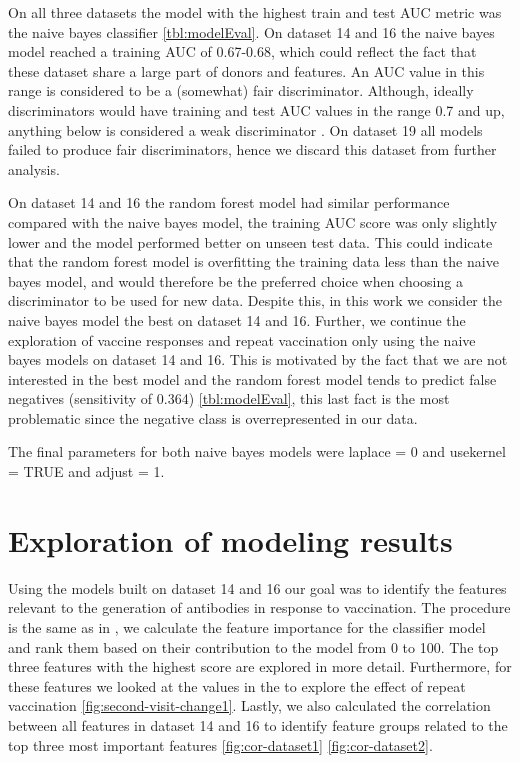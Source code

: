 On all three datasets the model with the highest train and test AUC metric was the naive bayes classifier \autoref{tbl:modelEval}.
On dataset 14 and 16 the naive bayes model reached a training AUC of 0.67-0.68, which could reflect the fact that these dataset share a large part of donors and features.
An AUC value in this range is considered to be a (somewhat) fair discriminator.
Although, ideally discriminators would have training and test AUC values in the range 0.7 and up, anything below is considered a weak discriminator \citep{L_demann_2006}.
On dataset 19 all models failed to produce fair discriminators, hence we discard this dataset from further analysis.

On dataset 14 and 16 the random forest model had similar performance compared with the naive bayes model, the training AUC score was only slightly lower and the model performed better on unseen test data.
This could indicate that the random forest model is overfitting the training data less than the naive bayes model, and would therefore be the preferred choice when choosing a discriminator to be used for new data.
Despite this, in this work we consider the naive bayes model the best on dataset 14 and 16.
Further, we continue the exploration of vaccine responses and repeat vaccination only using the naive bayes models on dataset 14 and 16.
This is motivated by the fact that we are not interested in the best model and the random forest model tends to predict false negatives (sensitivity of 0.364) \autoref{tbl:modelEval}, this last fact is the most problematic since the negative class is overrepresented in our data.

The final parameters for both naive bayes models were laplace = 0 and usekernel = TRUE and adjust = 1.

\section{Exploration of modeling results}

Using the models built on dataset 14 and 16 our goal was to identify the features relevant to the generation of antibodies in response to vaccination.
The procedure is the same as in \spaper, we calculate the feature importance for the classifier model and rank them based on their contribution to the model from 0 to 100.
The top three features with the highest score are explored in more detail.
Furthermore, for these features we looked at the values in the \secondvis to explore the effect of repeat vaccination \autoref{fig:second-visit-change1}.
Lastly, we also calculated the correlation between all features in dataset 14 and 16 to identify feature groups related to the top three most important features \autoref{fig:cor-dataset1} \autoref{fig:cor-dataset2}.

